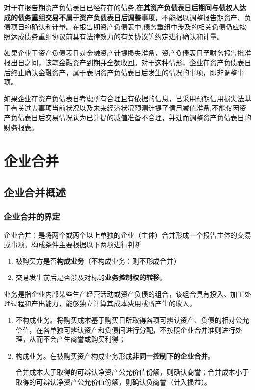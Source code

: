 \documentclass[UTF8,12pt]{ctexart}
\numberwithin{equation}{section} %
\numberwithin{figure}{section}
\numberwithin{table}{section}
\begin{document}
	对于在报告期资产负债表日已经存在的债务,\textbf{在其资产负债表日后期间与债权人达成的债务重组交易不属于资产负债表日后调整事项}，不能据以调整报告期资产、负债项目的确认和计量。在报告期资产负债表中,债务重组中涉及的相关负债仍应按照达成债务重组协议前具有法律效力的有关协议等约定进行确认和计量。
	
	如果企业于资产负债表日对金融资产计提损失准备，资产负债表日至财务报告批准报出日之间，该笔金融资产到期并全额收回。对于这种情形，企业在资产负债表日后终止确认金融资产，属于表明资产负债表日后发生的情况的事项，即非调整事项。
	
	如果企业在资产负债表日考虑所有合理且有依据的信息，已采用预期信用损失法基于有关过去事项当前状况以及未来经济状况预测计提了信用减值准备,不能仅因资产负债表日后交易情况认为已计提的减值准备不合理，并进而调整资产负债表日的财务报表。
	\newpage
	
	\section{企业合并}
	\subsection{企业合并概述}
	\subsubsection{企业合并的界定}
	企业合并：是将两个或两个以上单独的企业（主体）合并形成一个报告主体的交易或事项。构成条件主要根据以下两项进行判断
	\begin{enumerate}
		\item 被购买方是否\textbf{构成业务}（不构成业务：则不形成合并）
		
		\item 交易发生前后是否涉及对标的\textbf{业务控制权的转移}。
	\end{enumerate}
	
	业务是指企业内部某些生产经营活动或资产负债的组合，该组合具有投入、加工处理过程和产出能力，能够独立计算其成本费用或所产生的收入。
	\begin{enumerate}
		\item 不构成业务。将购买成本基于购买日所取得各项可辨认资产、负债的相对公允价值，在各单独可辨认资产和负债间进行分配，不按照企业合并准则进行处理，从而不会产生商誉或购买利得；
		
		\item 构成业务。在被购买资产构成业务形成\textbf{非同一控制下的企业合并}。
		
		合并成本大于取得的可辨认净资产公允价值份额，则确认商誉；合并成本小于取得的可辨认净资产公允价值份额，则确认负商誉（计入损益）。
	\end{enumerate}
	
\end{document}
